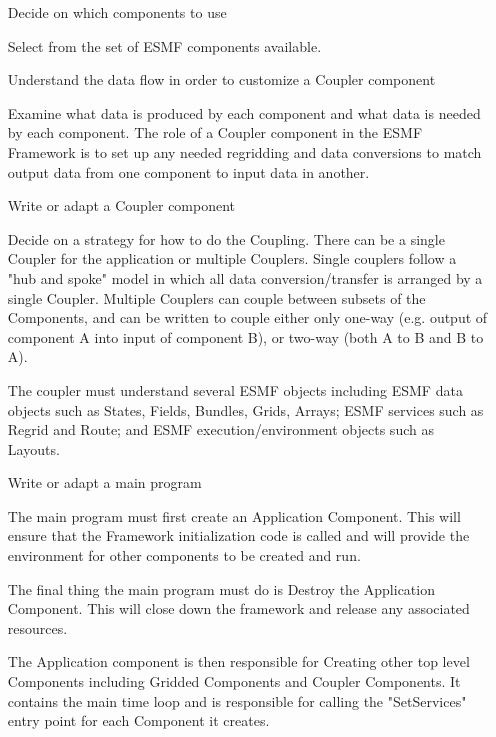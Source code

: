 \begin{enumerate}

\item[Decide on which components to use]

Select from the set of ESMF components available.

\item[Understand the data flow in order to customize a Coupler component]

Examine what data is produced by each component and what data is
needed by each component.  The role of a Coupler component in the
ESMF Framework is to set up any needed regridding and data conversions
to match output data from one component to input data in another.

\item[Write or adapt a Coupler component]

Decide on a strategy for how to do the Coupling.  There can be a single
Coupler for the application or multiple Couplers.
Single couplers follow a "hub and
spoke" model in which all data conversion/transfer is arranged
by a single Coupler.
Multiple Couplers can couple between subsets of the Components, and
can be written to couple either only one-way
(e.g. output of component A into input of component B), or two-way
(both A to B and B to A).  

The coupler must understand several ESMF objects including ESMF data objects
such as States, Fields, Bundles, Grids, Arrays; ESMF services
such as Regrid and Route; and ESMF execution/environment objects
such as Layouts.    

\item[Write or adapt a main program]

The main program must first create an Application Component.  This
will ensure that the Framework initialization code is called and will
provide the environment for other components to be created and run.

The final thing the main program must do is Destroy the Application 
Component.
This will close down the framework and release any associated resources.

The Application component is then responsible for Creating other top level
Components including Gridded Components and Coupler Components.  It
contains the main time loop and is responsible for calling the
"SetServices" entry point for each Component it creates.

\end{enumerate}



























